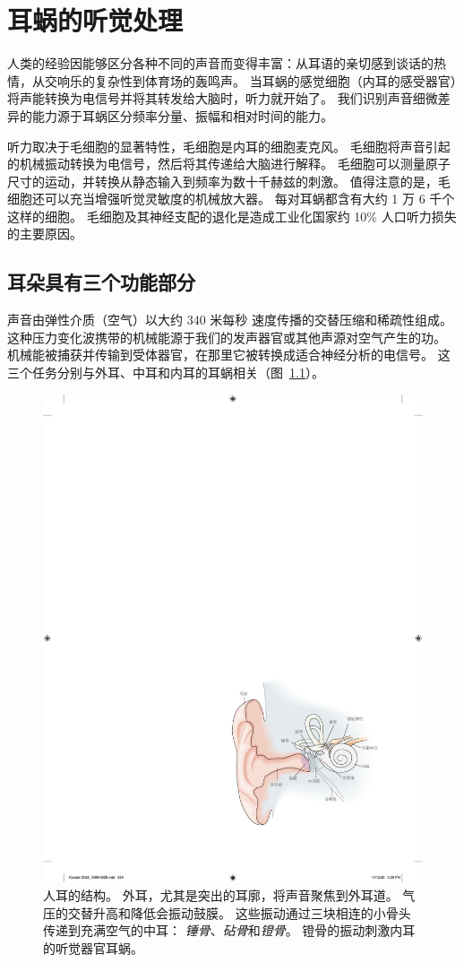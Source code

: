 \chapter{耳蜗的听觉处理} \label{chap:chap26}

人类的经验因能够区分各种不同的声音而变得丰富：从耳语的亲切感到谈话的热情，从交响乐的复杂性到体育场的轰鸣声。
当耳蜗的感觉细胞（内耳的感受器官）将声能转换为电信号并将其转发给大脑时，听力就开始了。
我们识别声音细微差异的能力源于耳蜗区分频率分量、振幅和相对时间的能力。


听力取决于毛细胞的显著特性，毛细胞是内耳的细胞麦克风。
毛细胞将声音引起的机械振动转换为电信号，然后将其传递给大脑进行解释。
毛细胞可以测量原子尺寸的运动，并转换从静态输入到频率为数十千赫兹的刺激。
值得注意的是，毛细胞还可以充当增强听觉灵敏度的机械放大器。
每对耳蜗都含有大约 1 万 6 千个这样的细胞。
毛细胞及其神经支配的退化是造成工业化国家约 10\% 人口听力损失的主要原因。



\section{耳朵具有三个功能部分}

声音由弹性介质（空气）以大约 340 米每秒 速度传播的交替压缩和稀疏性组成。
这种压力变化波携带的机械能源于我们的发声器官或其他声源对空气产生的功。
机械能被捕获并传输到受体器官，在那里它被转换成适合神经分析的电信号。
这三个任务分别与外耳、中耳和内耳的耳蜗相关（图~\ref{fig:26_1}）。


\begin{figure}[htbp]
	\centering
	\includegraphics[width=0.7\linewidth]{chap26/fig_26_1}
	\caption{人耳的结构。 
		外耳，尤其是突出的耳廓，将声音聚焦到外耳道。
		气压的交替升高和降低会振动鼓膜。
		这些振动通过三块相连的小骨头传递到充满空气的中耳：
		\textit{锤骨}、\textit{砧骨}和\textit{镫骨}。 
		镫骨的振动刺激内耳的听觉器官耳蜗。}
	\label{fig:26_1}
\end{figure}


